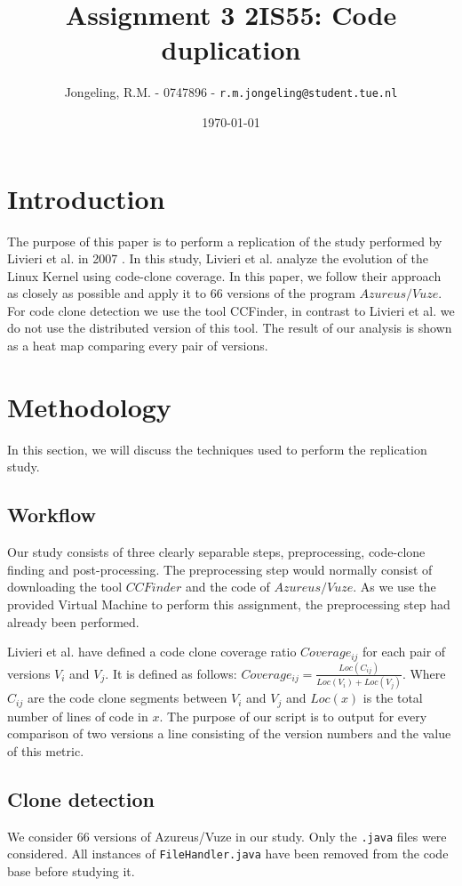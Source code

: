 \documentclass[a4paper,twoside, twocolumn, 11pt]{article}
\title{\vspace{-\baselineskip}\sffamily\bfseries Assignment 3 2IS55: Code duplication}
\author{Jongeling, R.M. - 0747896 - {\tt r.m.jongeling@student.tue.nl}}
\date{\today}
\numberwithin{equation}{section}
\begin{document}
\maketitle

\section{Introduction}
The purpose of this paper is to perform a replication of the study performed by Livieri et al. in 2007 \cite{paper}.
In this study, Livieri et al. analyze the evolution of the Linux Kernel using code-clone coverage.
In this paper, we follow their approach as closely as possible and apply it to 66 versions of the program $Azureus/Vuze$.
For code clone detection we use the tool CCFinder, in contrast to Livieri et al. we do not use the distributed version of this tool.
The result of our analysis is shown as a heat map comparing every pair of versions.


\section{Methodology}
In this section, we will discuss the techniques used to perform the replication study.

\subsection{Workflow}
Our study consists of three clearly separable steps, preprocessing, code-clone finding and post-processing.
The preprocessing step would normally consist of downloading the tool $CCFinder$ and the code of $Azureus/Vuze$.
As we use the provided Virtual Machine to perform this assignment, the preprocessing step had already been performed.

Livieri et al. have defined a code clone coverage ratio $Coverage_{ij}$ for each pair of versions $V_i$ and $V_j$. 
It is defined as follows: $Coverage_{ij} = \frac{Loc(C_{ij})}{Loc(V_i) + Loc(V_j)}$.
Where $C_{ij}$ are the code clone segments between $V_i$ and $V_j$ and $Loc(x)$ is the total number of lines of code in $x$.
The purpose of our script is to output for every comparison of two versions a line consisting of the version numbers and the value of this metric.

\subsection{Clone detection}
We consider 66 versions of Azureus/Vuze in our study. 
Only the \texttt{.java} files were considered.
All instances of \texttt{FileHandler.java} have been removed from the code base before studying it.
\end{document}
